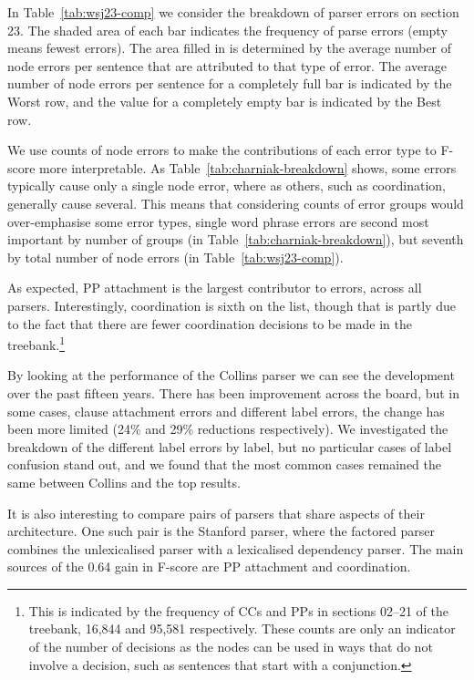 In Table~\ref{tab:wsj23-comp} we consider the breakdown of parser errors on \wsj section 23.
The shaded area of each bar indicates the frequency of parse errors (\myie empty means fewest errors).
The area filled in is determined by the average number of node errors per sentence that are attributed to that type of error.
The average number of node errors per sentence for a completely full bar is indicated by the Worst row, and the value for a completely empty bar is indicated by the Best row.

We use counts of node errors to make the contributions of each error type to F-score more interpretable.
As Table~\ref{tab:charniak-breakdown} shows, some errors typically cause only a single node error, where as others, such as coordination, generally cause several.
This means that considering counts of error groups would over-emphasise some error types, \myeg single word phrase errors are second most important by number of groups (in Table~\ref{tab:charniak-breakdown}), but seventh by total number of node errors (in Table~\ref{tab:wsj23-comp}).

As expected, PP attachment is the largest contributor to errors, across all parsers.
Interestingly, coordination is sixth on the list, though that is partly due to the fact that there are fewer coordination decisions to be made in the treebank.\footnote{This is indicated by the frequency of CCs and PPs in sections 02--21 of the treebank, 16,844 and 95,581 respectively.
These counts are only an indicator of the number of decisions as the nodes can be used in ways that do not involve a decision, such as sentences that start with a conjunction.}

By looking at the performance of the Collins parser we can see the development
over the past fifteen years.  There has been improvement across
the board, but in some cases, \myeg clause attachment errors and different label
errors, the change has been more limited (24\% and 29\% reductions respectively).  We
investigated the breakdown of the different label errors by label, but no
particular cases of label confusion stand out, and we found that the most
common cases remained the same between Collins and the top results.

It is also interesting to compare pairs of parsers that share aspects of their
architecture.  One such pair is the Stanford parser, where the factored parser
combines the unlexicalised parser with a lexicalised dependency parser.  The
main sources of the 0.64 gain in F-score are PP attachment and coordination.


